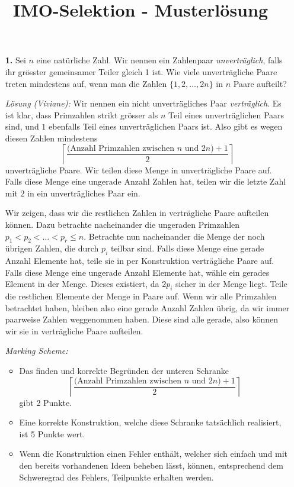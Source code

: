\documentclass[language=german,style=solution]{smo}
\title{IMO-Selektion - Musterlösung}
\begin{document}
\begin{enumerate}

\item[\textbf{1.}] %
Sei $n$ eine natürliche Zahl. Wir nennen ein Zahlenpaar \emph{unverträglich}, falls ihr grösster gemeinsamer Teiler gleich 1 ist. Wie viele unverträgliche Paare treten mindestens auf, wenn man die Zahlen $\{1, 2, \ldots, 2n\}$ in $n$ Paare aufteilt?

\textit{Lösung (Viviane):}
Wir nennen ein nicht unverträgliches Paar \emph{verträglich}. Es ist klar, dass Primzahlen strikt grösser als $n$ Teil eines unverträglichen Paars sind, und $1$ ebenfalls Teil eines unverträglichen Paars ist. Also gibt es wegen diesen Zahlen mindestens
\[
	\left\lceil\frac{\text{(Anzahl Primzahlen zwischen }n \text{ und }2n) + 1}{2}\right\rceil
\]
unverträgliche Paare. Wir teilen diese Menge in unverträgliche Paare auf. Falls diese Menge eine ungerade Anzahl Zahlen hat, teilen wir die letzte Zahl mit $2$ in ein unverträgliches Paar ein.

 Wir zeigen, dass wir die restlichen Zahlen in verträgliche Paare aufteilen können. Dazu betrachte nacheinander die ungeraden Primzahlen $p_1<p_2<\ldots<p_r\leq n$. Betrachte nun nacheinander die Menge der noch übrigen Zahlen, die durch $p_i$ teilbar sind. Falls diese Menge eine gerade Anzahl Elemente hat, teile sie in per Konstruktion verträgliche Paare auf. Falls diese Menge eine ungerade Anzahl Elemente hat, wähle ein gerades Element in der Menge. Dieses existiert, da $2p_i$ sicher in der Menge liegt. Teile die restlichen Elemente der Menge in Paare auf. Wenn wir alle Primzahlen betrachtet haben, bleiben also eine gerade Anzahl Zahlen übrig, da wir immer paarweise Zahlen weggenommen haben. Diese sind alle gerade, also können wir sie in verträgliche Paare aufteilen.
 
\textit{Marking Scheme:}
\begin{itemize}
\item Das finden und korrekte Begründen der unteren Schranke
\[
	\left\lceil\frac{\text{(Anzahl Primzahlen zwischen }n \text{ und }2n) + 1}{2}\right\rceil
\]
gibt 2 Punkte.
\item Eine korrekte Konstruktion, welche diese Schranke tatsächlich realisiert, ist 5 Punkte wert. 
\item Wenn die Konstruktion einen Fehler enthält, welcher sich einfach und mit den bereits vorhandenen Ideen beheben lässt, können, entsprechend dem Schweregrad des Fehlers, Teilpunkte erhalten werden.
\end{itemize}



\end{enumerate}
\end{document}
